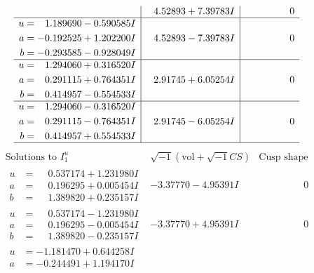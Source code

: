 \documentclass[1p]{elsarticle_modified}
\theoremstyle{definition}
\newcommand{\I}{\sqrt{-1}}
\begin{document}
$$\begin{array}{c|c|c}
 & \phantom{-}4.52893 + 7.39783 I & \phantom{-0.000000 } 0 \\ \hline\begin{aligned}
u &= \phantom{-}1.189690 - 0.590585 I \\
a &= -0.192525 + 1.202200 I \\
b &= -0.293585 - 0.928049 I\end{aligned}
 & \phantom{-}4.52893 - 7.39783 I & \phantom{-0.000000 } 0 \\ \hline\begin{aligned}
u &= \phantom{-}1.294060 + 0.316520 I \\
a &= \phantom{-}0.291115 + 0.764351 I \\
b &= \phantom{-}0.414957 - 0.554533 I\end{aligned}
 & \phantom{-}2.91745 + 6.05254 I & \phantom{-0.000000 } 0 \\ \hline\begin{aligned}
u &= \phantom{-}1.294060 - 0.316520 I \\
a &= \phantom{-}0.291115 - 0.764351 I \\
b &= \phantom{-}0.414957 + 0.554533 I\end{aligned}
 & \phantom{-}2.91745 - 6.05254 I & \phantom{-0.000000 } 0\\
 \hline 
 \end{array}$$\newpage$$\begin{array}{c|c|c}  
\text{Solutions to }I^u_{1}& \I (\text{vol} + \sqrt{-1}CS) & \text{Cusp shape}\\
 \hline 
\begin{aligned}
u &= \phantom{-}0.537174 + 1.231980 I \\
a &= \phantom{-}0.196295 + 0.005454 I \\
b &= \phantom{-}1.389820 + 0.235157 I\end{aligned}
 & -3.37770 - 4.95391 I & \phantom{-0.000000 } 0 \\ \hline\begin{aligned}
u &= \phantom{-}0.537174 - 1.231980 I \\
a &= \phantom{-}0.196295 - 0.005454 I \\
b &= \phantom{-}1.389820 - 0.235157 I\end{aligned}
 & -3.37770 + 4.95391 I & \phantom{-0.000000 } 0 \\ \hline\begin{aligned}
u &= -1.181470 + 0.644258 I \\
a &= -0.244491 + 1.194170 I \\

\end{aligned}
\end{array}$$
\end{document}
